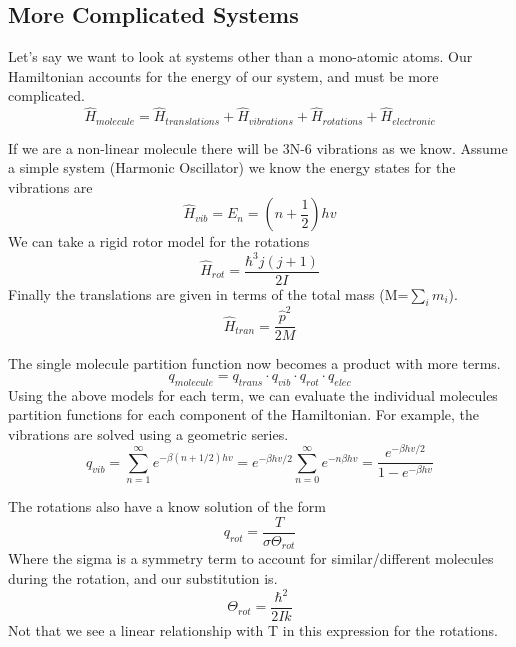 \documentclass{article}
\begin{document}
 \subsection*{More Complicated Systems}
 Let's say we want to look at systems other than a mono-atomic atoms.
 Our Hamiltonian accounts for the energy of our system, and must be more complicated. 
 \begin{equation}
  \hat{H}_{molecule} = \hat{H}_{translations} + \hat{H}_{vibrations} + \hat{H}_{rotations} + \hat{H}_{electronic}
 \end{equation}
 
 If we are a non-linear molecule there will be 3N-6 vibrations as we know. 
Assume a simple system (Harmonic Oscillator) we know the energy states for the vibrations are 
\begin{equation}
 \hat{H}_{vib} = E_n = \left(n+\frac{1}{2}\right)hv
\end{equation}
 We can take a rigid rotor model for the rotations  
 \begin{equation}
  \hat{H}_{rot} = \frac{\hbar^3 j(j+1)}{2I}
 \end{equation}
 Finally the translations are given in terms of the total mass (M=$\sum_i m_i$). 
 \begin{equation}
  \hat{H}_{tran} = \frac{\hat{p}^2}{2M}
 \end{equation}
 
 The single molecule partition function now becomes a product with more terms. 
 \begin{equation}
  q_{molecule} = q_{trans}\cdot q_{vib} \cdot q_{rot} \cdot q_{elec}
 \end{equation}
 Using the above models for each term, we can evaluate the individual molecules partition functions for each component of the Hamiltonian. 
 For example, the vibrations are solved using a geometric series. 
 \begin{equation}
  q_{vib} = \sum_{n=1}^\infty e^{-\beta(n+1/2)hv} = e^{-\beta hv/2} \sum_{n=0}^\infty e^{-n\beta hv} = \frac{e^{-\beta hv/2}}{1-e^{-\beta hv}}
 \end{equation}
 
 The rotations also have a know solution of the form 
 \begin{equation}
  q_{rot} = \frac{T}{\sigma \Theta_{rot}}
 \end{equation}
 Where the sigma is a symmetry term to account for similar/different molecules during the rotation, and our substitution is. 
 \begin{equation}
  \Theta_{rot} = \frac{\hbar^2}{2Ik}
 \end{equation}
 Not that we see a linear relationship with T in this expression for the rotations. 
 
\end{document}
